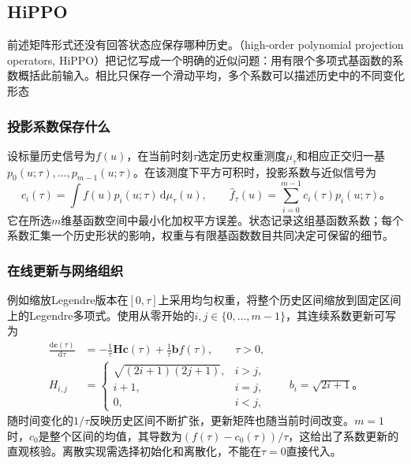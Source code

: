 \subsection{HiPPO}
\label{sec:rnn-hippo}

前述矩阵形式还没有回答状态应保存哪种历史。（high-order polynomial projection operators, HiPPO）把记忆写成一个明确的近似问题：用有限个多项式基函数的系数概括此前输入。相比只保存一个滑动平均，多个系数可以描述历史中的不同变化形态

\subsubsection{投影系数保存什么}
\label{sec:rnn-hippo-memory}

设标量历史信号为$f(u)$，在当前时刻$\tau$选定历史权重测度$\mu_\tau$和相应正交归一基$p_0(u;\tau),\ldots,p_{m-1}(u;\tau)$。在该测度下平方可积时，投影系数与近似信号为
\begin{equation}
  c_i(\tau)=\int f(u)p_i(u;\tau)\,\mathrm{d}\mu_\tau(u),
  \qquad
  \widehat f_\tau(u)=\sum_{i=0}^{m-1}c_i(\tau)p_i(u;\tau)\text{。}
  \label{eq:rnn-hippo-projection}
\end{equation}
它在所选$m$维基函数空间中最小化加权平方误差。状态记录这组基函数系数；每个系数汇集一个历史形状的影响，权重与有限基函数数目共同决定可保留的细节。

\subsubsection{在线更新与网络组织}
\label{sec:rnn-hippo-architecture}

例如缩放Legendre版本在$[0,\tau]$上采用均匀权重，将整个历史区间缩放到固定区间上的Legendre多项式。使用从零开始的$i,j\in\{0,\ldots,m-1\}$，其连续系数更新可写为
\begin{equation}
  \begin{aligned}
    \frac{\mathrm{d}\bm{c}(\tau)}{\mathrm{d}\tau}
      &=-\frac{1}{\tau}\bm{H}\bm{c}(\tau)
        +\frac{1}{\tau}\bm{b}f(\tau),\qquad \tau>0,\\
    H_{i,j}&=
      \begin{cases}
        \sqrt{(2i+1)(2j+1)},&i>j,\\
        i+1,&i=j,\\
        0,&i<j,
      \end{cases}
      \qquad b_i=\sqrt{2i+1}\text{。}
  \end{aligned}
  \label{eq:rnn-hippo-legs}
\end{equation}
随时间变化的$1/\tau$反映历史区间不断扩张，更新矩阵也随当前时间改变。$m=1$时，$c_0$是整个区间的均值，其导数为$(f(\tau)-c_0(\tau))/\tau$，这给出了系数更新的直观核验。离散实现需选择初始化和离散化，不能在$\tau=0$直接代入。

